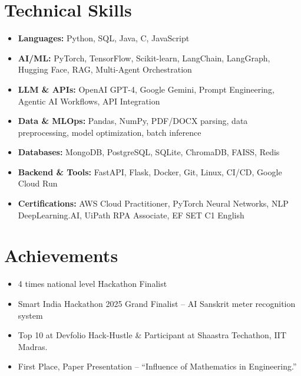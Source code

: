 \documentclass[letterpaper,11pt]{article}
\newcommand{\resumeItem}[1]{
  \item\small{
    {#1 \vspace{-2pt}}
  }
}
\newcommand{\resumeItemListStart}{\begin{itemize}}
\newcommand{\resumeItemListEnd}{\end{itemize}\vspace{-5pt}}
\begin{document}
\section{Technical Skills}
 \resumeItemListStart
    \resumeItem{\textbf{Languages:} Python, SQL, Java, C, JavaScript}
    \resumeItem{\textbf{AI/ML:} PyTorch, TensorFlow, Scikit-learn, LangChain, LangGraph, Hugging Face, RAG, Multi-Agent Orchestration}
    \resumeItem{\textbf{LLM \& APIs:} OpenAI GPT-4, Google Gemini, Prompt Engineering, Agentic AI Workflows, API Integration}
    \resumeItem{\textbf{Data \& MLOps:} Pandas, NumPy, PDF/DOCX parsing, data preprocessing, model optimization, batch inference}
    \resumeItem{\textbf{Databases:} MongoDB, PostgreSQL, SQLite, ChromaDB, FAISS, Redis}
    \resumeItem{\textbf{Backend \& Tools:} FastAPI, Flask, Docker, Git, Linux, CI/CD, Google Cloud Run}
    \resumeItem{\textbf{Certifications:} AWS Cloud Practitioner, PyTorch Neural Networks, NLP DeepLearning.AI, UiPath RPA Associate, EF SET C1 English}
 \resumeItemListEnd

\section{Achievements}
\resumeItemListStart
 \resumeItem{ 4 times national level Hackathon Finalist}
  \resumeItem{Smart India Hackathon 2025 Grand Finalist -- AI Sanskrit meter recognition system }
  \resumeItem{Top 10 at Devfolio Hack-Hustle \& Participant at Shaastra Techathon, IIT Madras.}
  \resumeItem{First Place, Paper Presentation -- ``Influence of Mathematics in Engineering.''}
\resumeItemListEnd

\end{document}
